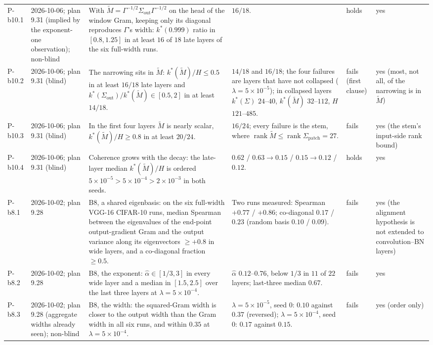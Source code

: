 \begin{longtable}{p{1.1cm}p{1.4cm}p{6.2cm}p{4.6cm}p{2.0cm}p{1.6cm}}
P-b10.1 & 2026-10-06; plan 9.31 (implied by the exponent-one observation); non-blind & With $\tilde M = \Gamma^{-1/2}\Sigma_{\mathrm{out}}\Gamma^{-1/2}$ on the head of the window Gram, keeping only its diagonal reproduces $\Gamma$'s width: $k^*(0.999)$ ratio in $[0.8, 1.25]$ in at least $16$ of $18$ late layers of the six full-width runs. & $16/18$. & holds & yes \\
P-b10.2 & 2026-10-06; plan 9.31 (blind) & The narrowing sits in $\tilde M$: $k^*(\tilde M)/H \le 0.5$ in at least $16/18$ late layers and $k^*(\Sigma_{\mathrm{out}})/k^*(\tilde M) \in [0.5, 2]$ in at least $14/18$. & $14/18$ and $16/18$; the four failures are layers that have not collapsed ($\lambda = 5\!\times\!10^{-5}$); in collapsed layers $k^*(\Sigma)$ $24$--$40$, $k^*(\tilde M)$ $32$--$112$, $H$ $121$--$485$. & fails (first clause) & yes (most, not all, of the narrowing is in $\tilde M$) \\
P-b10.3 & 2026-10-06; plan 9.31 (blind) & In the first four layers $\tilde M$ is nearly scalar, $k^*(\tilde M)/H \ge 0.8$ in at least $20/24$. & $16/24$; every failure is the stem, where $\operatorname{rank}\tilde M \le \operatorname{rank}\Sigma_{\mathrm{patch}} = 27$. & fails & yes (the stem's input-side rank bound) \\
P-b10.4 & 2026-10-06; plan 9.31 (blind) & Coherence grows with the decay: the late-layer median $k^*(\tilde M)/H$ is ordered $5\!\times\!10^{-5} > 5\!\times\!10^{-4} > 2\!\times\!10^{-3}$ in both seeds. & $0.62$ / $0.63 \to 0.15$ / $0.15 \to 0.12$ / $0.12$. & holds & yes \\
P-b8.1 & 2026-10-02; plan 9.28 & B8, a shared eigenbasis: on the six full-width VGG-16 CIFAR-10 runs, median Spearman between the eigenvalues of the end-point output-gradient Gram and the output variance along its eigenvectors $\ge +0.8$ in wide layers, and a co-diagonal fraction $\ge 0.5$. & Two runs measured: Spearman $+0.77$ / $+0.86$; co-diagonal $0.17$ / $0.23$ (random basis $0.10$ / $0.09$). & fails & yes (the alignment hypothesis is not extended to convolution--BN layers) \\
P-b8.2 & 2026-10-02; plan 9.28 & B8, the exponent: $\hat\alpha \in [1/3, 3]$ in every wide layer and a median in $[1.5, 2.5]$ over the last three layers at $\lambda = 5\!\times\!10^{-4}$. & $\hat\alpha$ $0.12$--$0.76$, below $1/3$ in $11$ of $22$ layers; last-three median $0.67$. & fails & yes \\
P-b8.3 & 2026-10-02; plan 9.28 (aggregate widths already seen); non-blind & B8, the width: the squared-Gram width is closer to the output width than the Gram width in all six runs, and within $0.35$ at $\lambda = 5\!\times\!10^{-4}$. & $\lambda = 5\!\times\!10^{-5}$, seed 0: $0.10$ against $0.37$ (reversed); $\lambda = 5\!\times\!10^{-4}$, seed 0: $0.17$ against $0.15$. & fails & yes (order only) \\

\end{longtable}
